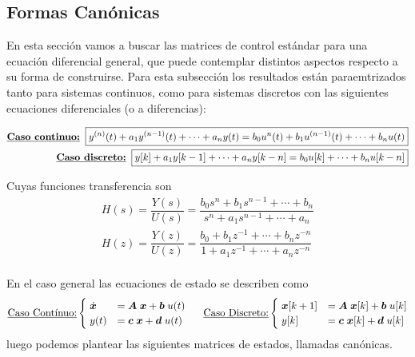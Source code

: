 \subsection{Formas Canónicas}
En esta sección vamos a buscar las matrices de control estándar para una ecuación
diferencial general, que puede contemplar distintos aspectos respecto a su forma de construirse. 
Para esta subsección los resultados están paraemtrizados tanto para sistemas continuos, como para sistemas discretos
con las siguientes ecuaciones diferenciales (o a diferencias): 


\begin{equation*}
    \begin{split}
        \text{\textbf{\underline{Caso continuo:}}} \; \; \boxed{y^{(n)}(t) + a_1 y^{(n-1)}(t) + \cdots + a_n y(t) = b_0 u^{n}(t) + b_1 u^{(n-1)}(t) + \cdots + b_n u(t)}      \\
        \text{\textbf{\underline{Caso discreto:}}} \; \; \boxed{y[k] + a_1 y[k-1] + \cdots + a_n y[k-n] = b_0 u[k] + \cdots + b_n u[k-n]}  \\
    \end{split}
\end{equation*}

Cuyas funciones transferencia son
\begin{equation*}
    \begin{split}
        H(s) = \dfrac{Y(s)}{U(s)} = \dfrac{b_0 s^n + b_1 s^{n-1} + \cdots + b_n}{s^n + a_1 s^{n-1} + \cdots + a_n} \\
        H(z) = \dfrac{Y(z)}{U(z)} = \dfrac{b_0 + b_1 z^{-1} + \cdots + b_n z^{-n}}{1 + a_1 z^{-1} + \cdots + a_n z^{-n}} \\
    \end{split} 
\end{equation*}

En el caso general las ecuaciones de estado se describen como
\begin{equation}
    \text{\underline{Caso Contínuo:}}
    \begin{cases}
        \; \dot{\bm{x}} &= \bm{A} \; \bm{x} + \bm{b} \; u(t) \\
        \; y(t) &= \bm{c} \;\bm{x} + \bm{d} \; u(t) \\
    \end{cases}%
    \hspace*{15pt}
    \text{\underline{Caso Discreto:}}    
    \begin{cases}
        \; \bm{x}[k+1] &= \bm{A} \; \bm{x}[k] + \bm{b} \; u[k] \\
        \; y[k] &= \bm{c} \;\bm{x}[k] + \bm{d} \; u[k] \\
    \end{cases}
\end{equation}
luego podemos plantear las siguientes matrices de estados, llamadas canónicas.
